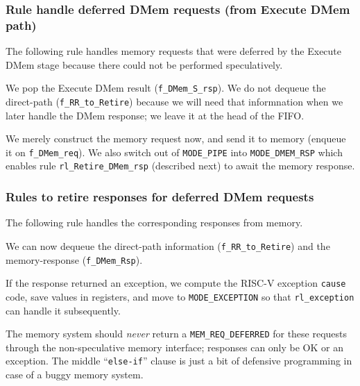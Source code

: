 \Endexercise


\subsubsection{Rule handle deferred DMem requests (from Execute DMem path)}

\label{Sec_Fife_DMem_deferred}

The following rule handles memory requests that were deferred by the
Execute DMem stage because there could not be performed speculatively.



We pop the Execute DMem result (\verb|f_DMem_S_rsp|).  We do not
dequeue the direct-path (\verb|f_RR_to_Retire|) because we will need
that informnation when we later handle the DMem response; we leave it
at the head of the FIFO.

We merely construct the memory request now, and send it to memory
(enqueue it on \verb|f_DMem_req|).  We also switch out of
\verb|MODE_PIPE| into \verb|MODE_DMEM_RSP| which enables rule
\verb|rl_Retire_DMem_rsp| (described next) to await the memory
response.


\subsubsection{Rules to retire responses for deferred DMem requests}

\label{Sec_Fife_Retire_DMem_deferred}

The following rule handles the corresponding responses from memory.



We can now dequeue the direct-path information (\verb|f_RR_to_Retire|)
and the memory-response (\verb|f_DMem_Rsp|).

If the response returned an exception, we compute the RISC-V exception
\verb|cause| code, save values in registers, and move to
\verb|MODE_EXCEPTION| so that \verb|rl_exception| can handle it
subsequently.

The memory system should \emph{never} return a \verb|MEM_REQ_DEFERRED|
for these requests through the non-speculative memory interface;
responses can only be OK or an exception.  The middle
``\verb|else-if|'' clause is just a bit of defensive programming in
case of a buggy memory system.

